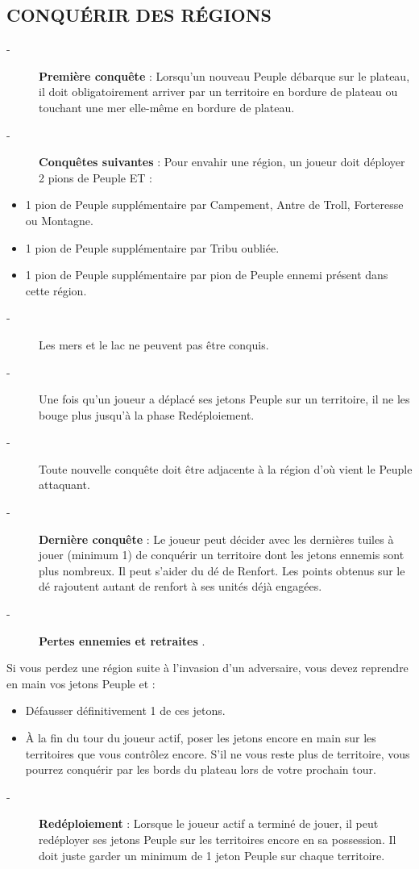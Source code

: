 \documentclass{scrartcl}%
\begin{document}
\subsection{ CONQUÉRIR DES RÉGIONS
}%
\label{subsec:CONQURIRDESRGIONS}%
\begin{description}%
\item[{-} ]%
%
\textbf{Première conquête}%
\textit{ }%
 : Lorsqu'un nouveau Peuple débarque sur le plateau, il doit obligatoirement arriver par un territoire en bordure de plateau ou touchant une mer elle{-}même en bordure de plateau.
%
\item[{-} ]%
%
\textbf{Conquêtes suivantes}%
\textit{ }%
 : Pour envahir une région, un joueur doit déployer 2 pions de Peuple ET :
%
\end{description}%
\begin{itemize}%
\item%
%
 1 pion de Peuple supplémentaire par Campement, Antre de Troll, Forteresse ou Montagne.
%
\item%
%
 1 pion de Peuple supplémentaire par Tribu oubliée.
%
\item%
%
 1 pion de Peuple supplémentaire par pion de Peuple ennemi présent dans cette région.
%
\end{itemize}%
\begin{description}%
\item[{-} ]%
%
 Les mers et le lac ne peuvent pas être conquis.
%
\item[{-} ]%
%
 Une fois qu'un joueur a déplacé ses jetons Peuple sur un territoire, il ne les bouge plus jusqu'à la phase Redéploiement.
%
\item[{-} ]%
%
 Toute nouvelle conquête doit être adjacente à la région d'où vient le Peuple attaquant.
%
\item[{-} ]%
%
\textbf{Dernière conquête}%
: Le joueur peut décider avec les dernières tuiles à jouer (minimum 1) de conquérir un territoire dont les jetons ennemis sont plus nombreux. Il peut s'aider du dé de Renfort. Les points obtenus sur le dé rajoutent autant de renfort à ses unités déjà engagées.
%
\item[{-} ]%
%
\textbf{Pertes ennemies et retraites}%
.
%
\end{description}%
Si vous perdez une région suite à l'invasion d'un adversaire, vous devez reprendre en main vos jetons Peuple et :
%
\begin{itemize}%
\item%
%
 Défausser définitivement 1 de ces jetons.
%
\item%
%
 À la fin du tour du joueur actif, poser les jetons encore en main sur les territoires que vous contrôlez encore. S'il ne vous reste plus de territoire, vous pourrez conquérir par les bords du plateau lors de votre prochain tour.
%
\end{itemize}%
\begin{description}%
\item[{-} ]%
%
\textbf{Redéploiement}%
\textit{ }%
 : Lorsque le joueur actif a terminé de jouer, il peut redéployer ses jetons Peuple sur les territoires encore en sa possession. Il doit juste garder un minimum de 1 jeton Peuple sur chaque territoire.
%
\end{description}
\end{document}
